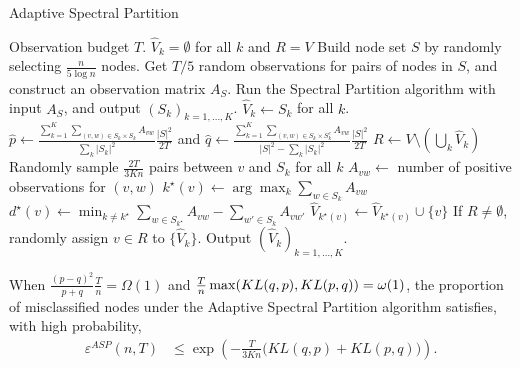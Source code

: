 \begin{algorithm}[t!]
   \caption{Adaptive Spectral Partition}
   \label{alg:adaptive}
\begin{algorithmic}
    Observation budget $T$. 
    $\hat{V}_k = \emptyset$ for all $k$ and
   $R = V$ 
    Build node set $S$ by randomly selecting $\frac{n}{5 \log n}$ nodes. 
\STATE Get $T/5$ random observations for pairs of nodes in $S$, and construct an observation matrix $A_S$.
   \STATE Run the Spectral Partition algorithm with input $A_S$, and output $(S_k)_{k=1,\ldots,K}$. $\hat{V}_k\leftarrow S_k$ for all $k$.
   \STATE $\hat{p} \leftarrow 
  \frac{\sum_{k=1}^{K}\sum_{(v,w) \in S_k \times S_k} A_{vw}}{\sum_{k} | S_k |^2}\frac{|S|^2}{2T} $ and $\hat{q} \leftarrow\frac{\sum_{k=1}^{K}\sum_{(v,w) \in S_k \times S^c_k} A_{vw}}{ |S|^2 - \sum_{k} | S_k
     |^2}\frac{|S|^2}{2T}$
\REPEAT
\STATE $R \leftarrow V\setminus (\bigcup_{k}\hat{V}_k   )$ 
\STATE Randomly sample $\frac{2T}{3Kn}$ pairs between $v$ and $S_k$ for
all $k$
\STATE $A_{vw} \leftarrow$ number of positive observations for $(v,w)$ 
\STATE $k^{\star}(v) \leftarrow \arg\max_{k} \sum_{w \in S_k} A_{vw}$ 
\STATE $d^{\star}(v) \leftarrow \min_{k \neq k^{\star}} \sum_{w \in S_{k^{\star}}}
A_{vw} - \sum_{w' \in S_k} A_{vw'}$
\STATE $\hat{V}_{k^{\star}(v)} \leftarrow \hat{V}_{k^{\star}(v)} \cup \{ v\}$
\ENDIF
\ENDFOR
{}
\STATE If $R\neq\emptyset$, randomly assign $v \in R$ to $\{ \hat{V}_k \}$. Output $(\hat{V}_k)_{k=1,\ldots,K}$.
\end{algorithmic}
\end{algorithm}

\begin{theorem} When $\frac{(p-q)^2}{p+q}\frac{T}{n} =\Omega(1)$ and ${T\over n}\max(KL(q,p),KL(p,q))=\omega(1)$, the proportion of misclassified nodes under the Adaptive Spectral Partition algorithm satisfies, with high probability,
\begin{align}\label{eq:up2}
 \varepsilon^{ASP}(n,T) & \le \exp\left(-\frac{T}{3Kn} \big( KL(q,p)+KL(p,q) \big) \right).
\end{align}
\label{thm:adapt-results}
\end{theorem}

